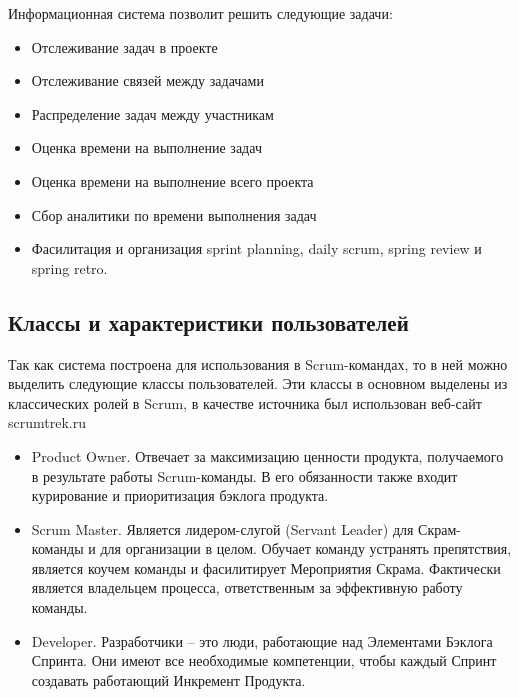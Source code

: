 Информационная система позволит решить следующие задачи:
\begin{itemize}
  \item Отслеживание задач в проекте
  \item Отслеживание связей между задачами
  \item Распределение задач между участникам
  \item Оценка времени на выполнение задач
  \item Оценка времени на выполнение всего проекта
  \item Сбор аналитики по времени выполнения задач
  \item Фасилитация и организация sprint planning, daily scrum, spring review и spring retro.
\end{itemize}

\subsection{Классы и характеристики пользователей}
Так как система построена для использования в Scrum-командах, то в ней
можно выделить следующие классы пользователей. Эти классы в основном выделены из
классических ролей в Scrum, в качестве источника был использован веб-сайт scrumtrek.ru
\begin{itemize}
  \item Product Owner. Отвечает за максимизацию ценности продукта, получаемого в результате работы Scrum-команды.
        В его обязанности также входит курирование и приоритизация бэклога продукта.
  \item Scrum Master. Является лидером-слугой (Servant Leader) для Скрам-команды и для организации в целом.
        Обучает команду устранять препятствия, является коучем команды и фасилитирует Мероприятия Скрама.
        Фактически является владельцем процесса, ответственным за эффективную работу команды.
  \item Developer. Разработчики -- это люди, работающие над Элементами Бэклога Спринта.
        Они имеют все необходимые компетенции, чтобы каждый Спринт создавать работающий Инкремент Продукта.
\end{itemize}


